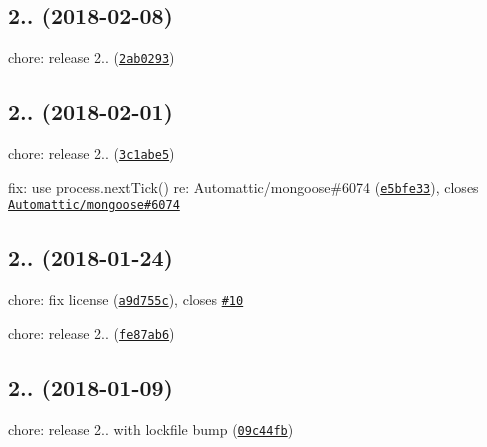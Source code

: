 \label{_2.0.4}%
 \subsection*{
\footnotesize 2.. (2018-\/02-\/08)
\normalsize }


\begin{DoxyItemize}
\item chore\+: release 2.. (\href{https://github.com/vkarpov15/kareem/commit/2ab0293}{\tt 2ab0293})
\end{DoxyItemize}

\label{_2.0.3}%
 \subsection*{
\footnotesize 2.. (2018-\/02-\/01)
\normalsize }


\begin{DoxyItemize}
\item chore\+: release 2.. (\href{https://github.com/vkarpov15/kareem/commit/3c1abe5}{\tt 3c1abe5})
\item fix\+: use process.\+next\+Tick() re\+: Automattic/mongoose\#6074 (\href{https://github.com/vkarpov15/kareem/commit/e5bfe33}{\tt e5bfe33}), closes \href{https://github.com/Automattic/mongoose/issues/6074}{\tt Automattic/mongoose\#6074}
\end{DoxyItemize}

\label{_2.0.2}%
 \subsection*{
\footnotesize 2.. (2018-\/01-\/24)
\normalsize }


\begin{DoxyItemize}
\item chore\+: fix license (\href{https://github.com/vkarpov15/kareem/commit/a9d755c}{\tt a9d755c}), closes \href{https://github.com/vkarpov15/kareem/issues/10}{\tt \#10}
\item chore\+: release 2.. (\href{https://github.com/vkarpov15/kareem/commit/fe87ab6}{\tt fe87ab6})
\end{DoxyItemize}

\label{_2.0.1}%
 \subsection*{
\footnotesize 2.. (2018-\/01-\/09)
\normalsize }


\begin{DoxyItemize}
\item chore\+: release 2.. with lockfile bump (\href{https://github.com/vkarpov15/kareem/commit/09c44fb}{\tt 09c44fb})
\end{DoxyItemize}

